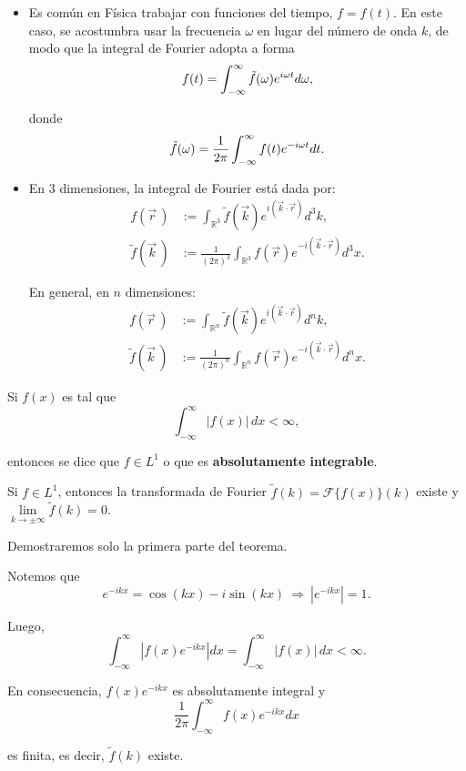 \begin{itemize}
    \item Es común en Física trabajar con funciones del tiempo, $f = f(t)$. En este caso, se acostumbra usar la frecuencia $\omega$ en lugar del número de onda $k$, de modo que la integral de Fourier adopta a forma
    $$
    f(t) = \int_{- \infty}^{\infty} \Tilde{f}(\omega) e^{i \omega t} d\omega,
    $$

    donde
    $$
    \Tilde{f}(\omega) = \frac{1}{2\pi} \int_{- \infty}^{\infty} f(t) e^{- i \omega t} dt.
    $$
    
    \item En 3 dimensiones, la integral de Fourier está dada por:
    \begin{align*}
         f(\vec{r}\,) &:= \int_{\mathbb{R}^3} \tilde{f}(\vec{k}) e^{i (\vec{k} \cdot \vec{r})} d^3k, \\
         \tilde{f}(\vec{k}\,) &:= \frac{1}{(2\pi)^3} \int_{\mathbb{R}^3} f(\vec{r}) e^{-i (\vec{k} \cdot \vec{r})} d^3x.
    \end{align*}
    
    En general, en $n$ dimensiones:
     \begin{align*}
         f(\vec{r}\,) &:= \int_{\mathbb{R}^n} \tilde{f}(\vec{k}) e^{i (\vec{k} \cdot \vec{r})} d^n k, \\
         \tilde{f}(\vec{k}\,) &:= \frac{1}{(2\pi)^n} \int_{\mathbb{R}^n} f(\vec{r}) e^{-i (\vec{k} \cdot \vec{r})} d^n x.
    \end{align*}
   
\end{itemize}


\begin{defi} 
Si $f(x)$ es tal que 
$$\int_{-\infty}^{\infty} |f(x)| \,dx < \infty,$$

entonces se dice que $f \in  L^1$ o que es \textbf{absolutamente integrable}.
\end{defi}

\begin{teorema}
Si $f \in L^1$, entonces la transformada de Fourier $\tilde{f}(k) = \mathcal{F}\{f(x)\}(k)$ existe y $\lim\limits_{k \to \pm \infty} \tilde{f}(k) = 0$.
\end{teorema}

\begin{demo}

Demostraremos solo la primera parte del teorema.

Notemos que
$$e^{-ikx} = \cos(kx) - i \sin(kx) ~\Rightarrow~ |e^{-ikx}| = 1.$$

Luego,
$$ \int_{-\infty}^{\infty} |f(x) e^{-ikx}| dx =  \int_{- \infty}^{\infty} |f(x)| \,dx < \infty.$$

En consecuencia, $f(x) e^{-ikx}$ es absolutamente integral y
$$\frac{1}{2\pi} \int_{-\infty}^{\infty} f(x) e^{-ikx} dx$$

es finita, es decir, $\tilde{f}(k)$ existe. 
\end{demo}

